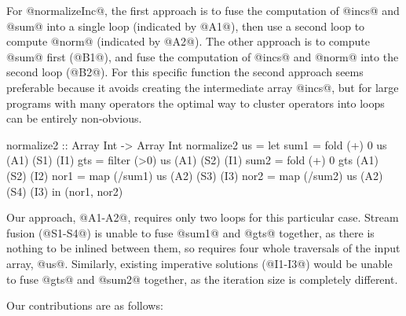 For @normalizeInc@, the first approach is to fuse the computation of @incs@ and @sum@ into a single loop (indicated by @A1@), then use a second loop to compute @norm@ (indicated by @A2@). The other approach is to compute @sum@ first (@B1@), and fuse the computation of @incs@ and @norm@ into the second loop (@B2@). For this specific function the second approach seems preferable because it avoids creating the intermediate array @incs@, but for large programs with many operators the optimal way to cluster operators into loops can be entirely non-obvious. 


\begin{code}
 normalize2 :: Array Int -> Array Int
 normalize2 us
  = let sum1 = fold   (+) 0 us      (A1) (S1) (I1)
        gts  = filter (>0)  us      (A1) (S2) (I1)
        sum2 = fold   (+) 0 gts     (A1) (S2) (I2)
        nor1 = map  (/sum1) us      (A2) (S3) (I3)
        nor2 = map  (/sum2) us      (A2) (S4) (I3)
    in (nor1, nor2)
\end{code}
Our approach, @A1-A2@, requires only two loops for this particular case.
Stream fusion (@S1-S4@) is unable to fuse @sum1@ and @gts@ together, as there is nothing to be inlined between them, so requires four whole traversals of the input array, @us@.
Similarly, existing imperative solutions (@I1-I3@) would be unable to fuse @gts@ and @sum2@ together, as the iteration size is completely different.

Our contributions are as follows:

